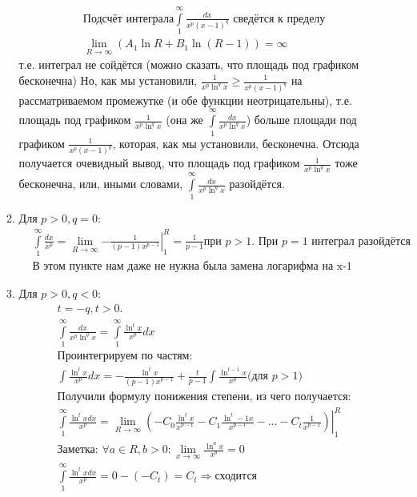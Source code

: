 \documentclass[a4paper, 12pt]{article}
\begin{document}
\begin{enumerate}
\begin{enumerate}
\begin{align*}
     &\text{Подсчёт интеграла} \int\limits_1^\infty\frac{dx}{x^p(x-1)^q} 
     \text{ сведётся  к пределу } \\
     &\lim_{R \to \infty} \left( A_1 \ln R + B_1 \ln (R-1)\right) = \infty
     \end{align*}
     т.е. интеграл не сойдётся (можно сказать, что площадь под графиком бесконечна)
     Но, как мы установили, $\frac{1}{x^p\ln^q x} \geq \frac{1}{x^p(x-1)^q}$ на рассматриваемом промежутке
     (и обе функции неотрицательны), т.е.
     площадь под графиком $\frac{1}{x^p\ln^q x}$ \Big(она же $\int\limits_1^\infty \frac{dx}{x^p\ln^qx}$\Big)
     больше площади под графиком $\frac{1}{x^p(x-1)^q}$, которая, как мы установили, бесконечна.
     Отсюда получается очевидный вывод, что площадь под графиком 
     $\frac{1}{x^p\ln^q x}$
     тоже бесконечна, или, иными словами, $\int\limits_1^\infty \frac{dx}{x^p\ln^qx}$ разойдётся.
     \item
     Для $p > 0, q = 0$:
     \begin{align*}
      &\int\limits_1^\infty \frac{dx}{x^p} = 
     \lim_{R \to \infty}\left.-\frac{1}{(p-1)x^{p-1}}\right|_1^R = \frac{1}{p-1} 
     \text{при $p>1$. При $p = 1$ интеграл разойдётся} \\
     &\text{В этом пункте нам даже не нужна была замена логарифма на x-1}
     \end{align*}
     \item
     Для $p > 0,q < 0$:
     \begin{align*}
      &t = -q, t>0. \\
      &\int\limits_1^\infty \frac{dx}{x^p\ln^qx} = 
      \int\limits_1^\infty \frac{\ln^t x}{x^p}dx \\
      &\text{Проинтегрируем по частям: } \\
      &\int\frac{\ln^t x}{x^p}dx =
      -\frac{\ln^t x}{(p-1)x^{p-1}} +\frac{t}{p-1}\int\frac{\ln^{t-1}x}{x^p}
      \text{(для $p>1$)}\\
      &\text{Получили формулу понижения степени, из чего получается: } \\
      &\int\limits_1^\infty \frac{\ln^t xdx}{x^p} = 
      \lim_{R\to\infty}\left.\left(-C_0\frac{\ln^t x}{x^{p-1}} -C_1\frac{\ln^t-1 x}{x^{p-1}} -... - C_t\frac{1}{x^{p-1}}\right)\right|_1^R \\
      &\boxed{\text{Заметка: } 
      \forall a \in R, b>0: \lim_{x\to\infty}\frac{\ln^a x}{x^b} = 0} \\
      &\int\limits_1^\infty \frac{\ln^t xdx}{x^p} = 0 -\left(-C_t\right) = C_t \Rightarrow \text{сходится} \\

\end{align*}
\end{enumerate}
\end{enumerate}
\end{document}
